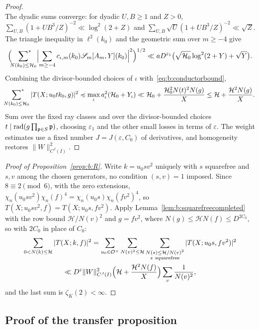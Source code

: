 \begin{proof}
\[\]
The dyadic sums converge: for dyadic $U,B\ge1$ and $Z>0$, $\sum_{U,B}(1+UB^3/Z)^{-2}\ll\log^2(2+Z)$ and $\sum_{U,B}\sqrt U(1+UB^3/Z)^{-2}\ll\sqrt Z$. The triangle inequality in $\ell^2(k_0)$ and the geometric sum over $m\ge-4$ give
\[
  \Bigl(\sideset{}{^*}\sum_{N(k_0)\le\mathcal H_0}\Bigl|\sum_{m\ge-4}c_{\iota,m}(k_0)\mathscr S_m[A_m,Y](k_0)\Bigr|^2\Bigr)^{1/2}\ll aD^{\varepsilon_1}\bigl(\sqrt{\mathcal H_0}\log^2(2+Y)+\sqrt Y\bigr).
\]
Combining the divisor-bounded choices of $\iota$ with~\eqref{eq:b:conductorbound},
\[
  \sideset{}{^*}\sum_{N(k_0)\le\mathcal H_0}|T(X;u_0tk_0,g)|^2\preccurlyeq\max_\iota a_\iota^2(\mathcal H_0+Y_\iota)\ll\mathcal H_0+\frac{\mathcal H_0^2N(t)^2N(g)}X\le\mathcal H+\frac{\mathcal H^2N(g)}X.
\]
Sum over the fixed ray classes and over the divisor-bounded choices $t\mid\operatorname{rad}(g\prod_{\mathfrak p\in S}\mathfrak p)$, choosing $\varepsilon_1$ and the other small losses in terms of $\varepsilon$. The weight estimates use a fixed number $J=J(\varepsilon,C_0)$ of derivatives, and homogeneity restores $\|W\|^2_{C^J(I)}$.
\end{proof}

\begin{proof}[Proof of Proposition~\ref{prop:b:R}]
Write $k=u_0sv^2$ uniquely with $s$ squarefree and $s,v$ among the chosen generators, no condition $(s,v)=1$ imposed. Since $8\equiv2\pmod6$, with the zero extensions, $\chi_n(u_0sv^2)\chi_n(f)^4=\chi_n(u_0s)\chi_n(fv^2)^4$, so $T(X;u_0sv^2,f)=T(X;u_0s,fv^2)$. Apply Lemma~\ref{lem:b:squarefreecompleted} with the row bound $\mathcal H/N(v)^2$ and $g=fv^2$, where $N(g)\le\mathcal HN(f)\le D^{2C_0}$, so with $2C_0$ in place of $C_0$:
\begin{multline*}
  \sum_{0<N(k)\le\mathcal H}|T(X;k,f)|^2=\sum_{u_0\in\mathcal{O}^\times}\sum_{N(v)^2\le\mathcal H}\sum_{\substack{N(s)\le\mathcal H/N(v)^2\\s\ {\rm squarefree}}}|T(X;u_0s,fv^2)|^2\\
  \ll D^\varepsilon\|W\|^2_{C^J(I)}\Bigl(\mathcal H+\frac{\mathcal H^2N(f)}X\Bigr)\sum_v\frac1{N(v)^2},
\end{multline*}
and the last sum is $\zeta_K(2)<\infty$.
\end{proof}

\subsection{Proof of the transfer proposition}\label{ssec:b:transferproof}


